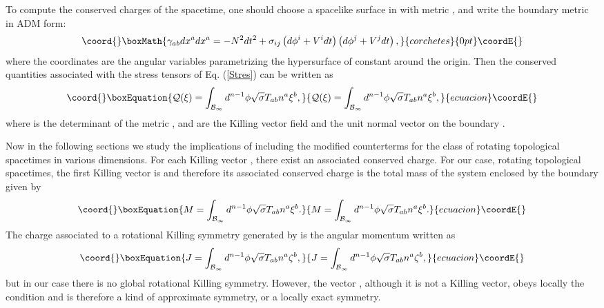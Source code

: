 \documentclass[a4paper,12pt,onecolumn]{revtex4}
\begin{document}
To compute the conserved charges of the spacetime, one should choose a
spacelike surface \coordHE{} in \coordHE{} with metric \coordHE{}, and write the boundary metric in ADM form:
\[\coord{}\boxMath{
\gamma _{ab}dx^adx^a=-N^2dt^2+\sigma _{ij}\left( d\phi ^i+V^idt\right)
\left( d\phi ^j+V^jdt\right) ,
}{corchetes}{0pt}\coordE{}\]
where the coordinates \coordHE{} are the angular variables
parametrizing the hypersurface of constant \coordHE{} around the origin.
Then the conserved quantities associated with the stress tensors
of Eq. (\ref{Stres}) can be written as
\begin{equation}\coord{}\boxEquation{
\mathcal{Q}(\mathcal{\xi )}=\int_{\mathcal{B}_\infty }d^{n-1}\phi \sqrt{
\sigma }T_{ab}n^a\mathcal{\xi }^b,  \label{charge}
}{
\mathcal{Q}(\mathcal{\xi )}=\int_{\mathcal{B}_\infty }d^{n-1}\phi \sqrt{
\sigma }T_{ab}n^a\mathcal{\xi }^b,  }{ecuacion}\coordE{}\end{equation}
where \myHighlight{$\sigma $}\coordHE{} is the determinant of the metric \coordHE{}, \myHighlight{$\mathcal{%
\xi }$}\coordHE{} and \coordHE{} are the Killing vector field and the unit normal
vector on the boundary \coordHE{} .

Now in the following sections we study the implications of
including the modified counterterms for the class of rotating
topological spacetimes in various dimensions. For each Killing
vector \myHighlight{$\mathcal{\xi }$}\coordHE{} , there exist an associated conserved
charge. For our case, rotating topological spacetimes, the first
Killing vector is \coordHE{} and therefore its
associated conserved charge is the total mass of the system
enclosed by the boundary given by
\begin{equation}\coord{}\boxEquation{
M=\int_{\mathcal{B}_\infty }d^{n-1}\phi \sqrt{\sigma }T_{ab}n^a\xi ^b.
\label{Mas}
}{
M=\int_{\mathcal{B}_\infty }d^{n-1}\phi \sqrt{\sigma }T_{ab}n^a\xi ^b.
}{ecuacion}\coordE{}\end{equation}
The charge associated to a rotational Killing symmetry generated
by \myHighlight{$\zeta =\partial /\partial \phi $}\coordHE{} is the angular momentum
written as
\begin{equation}\coord{}\boxEquation{
J=\int_{\mathcal{B}_\infty }d^{n-1}\phi \sqrt{\sigma }T_{ab}n^a\zeta ^b,
\label{Ang}
}{
J=\int_{\mathcal{B}_\infty }d^{n-1}\phi \sqrt{\sigma }T_{ab}n^a\zeta ^b,
}{ecuacion}\coordE{}\end{equation}
but in our case there is no global rotational Killing symmetry.
However, the vector \myHighlight{$\zeta =\partial /\partial \phi $}\coordHE{}, although it
is not a Killing vector, obeys locally the condition \coordHE{} and is therefore a kind of approximate
symmetry, or a locally exact symmetry.
\end{document}
